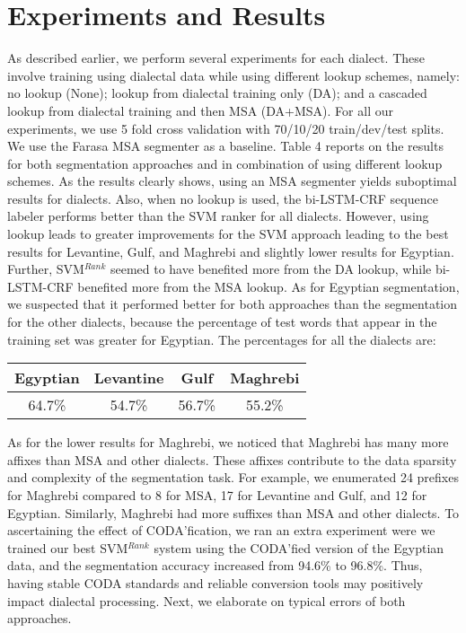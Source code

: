 \documentclass[11pt,letterpaper]{article}
\begin{document}
\section{Experiments and Results}


As described earlier, we perform several experiments for each dialect.  These involve training using dialectal data while using different lookup schemes, namely: no lookup (None); lookup from dialectal training only (DA); and a cascaded lookup from dialectal training and then MSA (DA+MSA).  For all our experiments, we use 5 fold cross validation with 70/10/20 train/dev/test splits.  We use the Farasa MSA segmenter as a baseline. Table 4 reports on the results for both segmentation approaches and in combination of using different lookup schemes.  As the results clearly shows, using an MSA segmenter yields suboptimal results for dialects.  Also, when no lookup is used, the bi-LSTM-CRF sequence labeler performs better than the SVM ranker for all dialects.  However, using lookup leads to greater improvements for the SVM approach leading to the best results for Levantine, Gulf, and Maghrebi and slightly lower results for Egyptian. Further, SVM$^{Rank}$ seemed to have benefited more from the DA lookup, while bi-LSTM-CRF benefited more from the MSA lookup. 
As for Egyptian segmentation, we suspected that it performed better for both approaches than the segmentation for the other dialects, because the percentage of test words that appear in the training set was greater for Egyptian.  The percentages for all the dialects are:
\begin{center}
\begin{tabular}{c|c|c|c}
Egyptian & Levantine & Gulf & Maghrebi \\ \hline
64.7\% & 54.7\% & 56.7\% & 55.2\% \\
\end{tabular}
\end{center}
As for the lower results for Maghrebi, we noticed that Maghrebi has many more affixes than MSA and other dialects. These affixes contribute to the data sparsity and complexity of the segmentation task. For example, we enumerated 24 prefixes for Maghrebi compared to 8 for MSA, 17 for Levantine and Gulf, and 12 for Egyptian. Similarly, Maghrebi had more suffixes than MSA and other dialects. To ascertaining the effect of CODA'fication, we ran an extra experiment were we trained our best SVM$^{Rank}$ system using the CODA'fied version of the Egyptian data, and  the segmentation accuracy increased from 94.6\% to 96.8\%. Thus, having stable CODA standards and reliable conversion tools may positively impact dialectal processing. 
Next, we elaborate on typical errors of both approaches.\\
\end{document}
